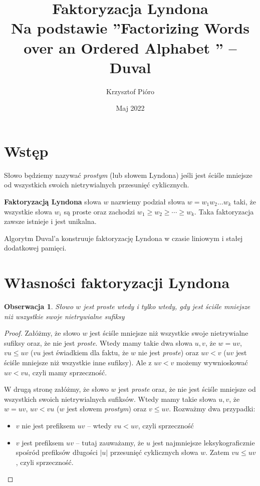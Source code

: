 \documentclass{article}
\title{Faktoryzacja Lyndona\\ \large Na podstawie ''Factorizing Words over an Ordered Alphabet '' -- Duval}
\author{Krzysztof Pióro}
\date{Maj 2022}
\newtheorem{observation}{Obserwacja}
\begin{document}
\maketitle

\section{Wstęp}

Słowo będziemy nazywać \textit{prostym} (lub słowem Lyndona) jeśli jest ściśle mniejsze od wszystkich swoich nietrywialnych przesunięć cyklicznych.

\textbf{Faktoryzacją Lyndona} słowa $w$ nazwiemy podział słowa $w = w_1w_2\ldots w_k$ taki, że wszystkie słowa $w_i$ są proste oraz zachodzi
$w_1 \geq w_2 \geq \cdots \geq w_k$. Taka faktoryzacja zawsze istnieje i jest unikalna.

Algorytm Duval'a konstruuje faktoryzację Lyndona w czasie liniowym i stałej dodatkowej pamięci.

\section{Własności faktoryzacji Lyndona}

\begin{observation}
    Słowo $w$ jest \textit{proste} wtedy i tylko wtedy, gdy jest ściśle mniejsze niż wszystkie swoje nietrywialne sufiksy 
\end{observation}

\begin{proof}
    Załóżmy, że słowo $w$ jest ściśle mniejsze niż wszystkie swoje nietrywialne sufiksy oraz, że nie jest \textit{proste}.
    Wtedy mamy takie dwa słowa $u, v$, że $w = uv$, $vu \leq uv$ ($vu$ jest świadkiem dla faktu, że $w$ nie jest \textit{proste}) oraz $uv < v$ 
    ($uv$ jest ściśle mniejsze niż wszystkie inne sufiksy). Ale z $uv < v$ możemy wywnioskować $uv < vu$, czyli mamy sprzeczność.

    W drugą stronę załóżmy, że słowo $w$ jest \textit{proste} oraz, że nie jest ściśle mniejsze od wszystkich swoich nietrywialnych sufiksów.
    Wtedy mamy takie słowa $u, v$, że $w = uv$, $uv < vu$ ($w$ jest słowem \textit{prostym}) oraz $v \leq uv$. Rozważmy dwa przypadki:
    \begin{itemize}
        \item $v$ nie jest prefiksem $uv$ -- wtedy $vu < uv$, czyli sprzeczność
        \item $v$ jest prefiksem $uv$ -- tutaj zauważamy, że $u$ jest najmniejsze leksykograficznie spośród prefiksów długości $|u|$ przesunięć cyklicznych słowa $w$.
        Zatem $vu \leq uv$, czyli sprzeczność.
    \end{itemize} 
\end{proof}
\end{document}
